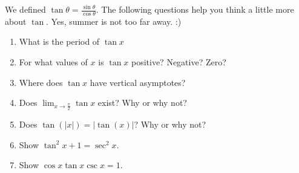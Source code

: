 \documentclass[12pt,twoside]{article}
\newcommand{\dsst}{\displaystyle}
\begin{document}
We defined $\tan \theta=\frac{\sin\theta}{\cos\theta}$. The following questions help you think a little more about $\tan$. Yes, summer is not too far away. :) 

\begin{enumerate}
      \item What is the period of $\tan x$
      \item For what values of $x$ is $\tan x$ positive?  Negative?  Zero?
       \item Where does $\tan x$ have vertical asymptotes?
      \item Does $\dsst\lim_{x\to\frac{\pi}{2}} \tan x$ exist?  Why or why not?
      \item Does $\tan (|x|) = | \tan(x) |$? Why or why not?
      \item Show $\tan^2 x + 1 = \sec^2 x$. 
      \item Show $\cos x \tan x \csc x = 1$. 
\end{enumerate}
\end{document}
